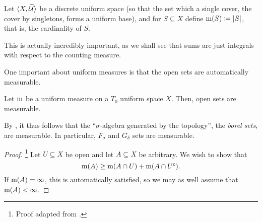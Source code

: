\begin{exm}
Let $\langle X,\widetilde{\mathcal{U}}\rangle$ be a discrete uniform space (so that the set which a single cover, the cover by singletons, forms a uniform base), and for $S\subseteq X$ define $\mathrm{m} (S)\coloneqq \lvert S\rvert$, that is, the cardinality of $S$.
\begin{rmk}
This is actually incredibly important, as we shall see that sums are just integrals with respect to the counting measure.
\end{rmk}
\end{exm}

One important about uniform measures is that the open sets are automatically measurable.
\begin{prp}\label{prp5.1.25}
Let $\mathrm{m}$ be a uniform measure on a $T_0$ uniform space $X$.  Then, open sets are measurable.
\begin{rmk}
By , it thus follows that the ``$\sigma$-algebra generated by the topology'', the \emph{borel sets}, are measurable.  In particular, $F_\sigma$ and $G_\delta$ sets are measurable.
\end{rmk}
\begin{proof}\footnote{Proof adapted from \cite[pg.~194]{Cohn}.}
Let $U\subseteq X$ be open and let $A\subseteq X$ be arbitrary.  We wish to show that
\begin{equation}
\mathrm{m} (A)\geq \mathrm{m} (A\cap U)+\mathrm{m} (A\cap U^{\mathsf{c}}).
\end{equation}
If $\mathrm{m} (A)=\infty$, this is automatically satisfied, so we may as well assume that $\mathrm{m} (A)<\infty$.


\end{proof}
\end{prp}
